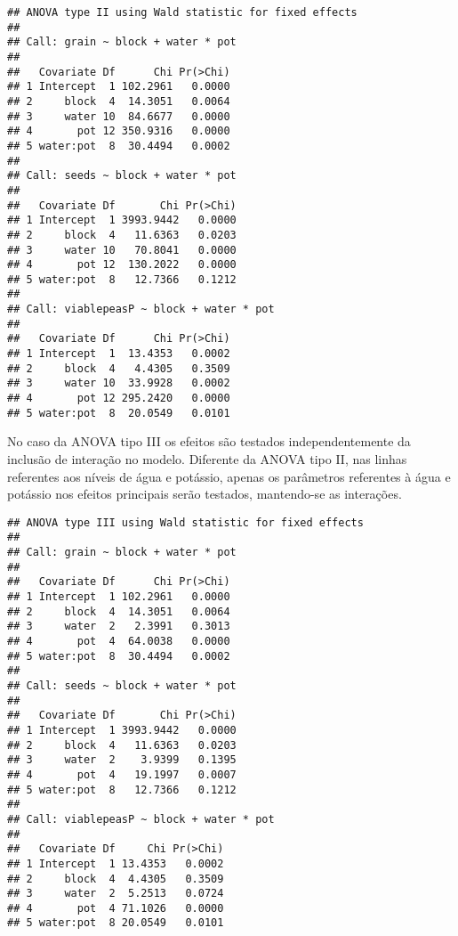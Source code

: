 \begin{knitrout}
\color{fgcolor}\begin{kframe}
\begin{alltt}
\end{alltt}
\begin{verbatim}
## ANOVA type II using Wald statistic for fixed effects
## 
## Call: grain ~ block + water * pot
## 
##   Covariate Df      Chi Pr(>Chi)
## 1 Intercept  1 102.2961   0.0000
## 2     block  4  14.3051   0.0064
## 3     water 10  84.6677   0.0000
## 4       pot 12 350.9316   0.0000
## 5 water:pot  8  30.4494   0.0002
## 
## Call: seeds ~ block + water * pot
## 
##   Covariate Df       Chi Pr(>Chi)
## 1 Intercept  1 3993.9442   0.0000
## 2     block  4   11.6363   0.0203
## 3     water 10   70.8041   0.0000
## 4       pot 12  130.2022   0.0000
## 5 water:pot  8   12.7366   0.1212
## 
## Call: viablepeasP ~ block + water * pot
## 
##   Covariate Df      Chi Pr(>Chi)
## 1 Intercept  1  13.4353   0.0002
## 2     block  4   4.4305   0.3509
## 3     water 10  33.9928   0.0002
## 4       pot 12 295.2420   0.0000
## 5 water:pot  8  20.0549   0.0101
\end{verbatim}
\end{kframe}
\end{knitrout}


No caso da ANOVA tipo III os efeitos são testados independentemente da inclusão de interação no modelo. Diferente da ANOVA tipo II, nas linhas referentes aos níveis de água e potássio, apenas os parâmetros referentes à água e potássio nos efeitos principais serão testados, mantendo-se as interações.

\begin{knitrout}
\color{fgcolor}\begin{kframe}
\begin{alltt}
\end{alltt}
\begin{verbatim}
## ANOVA type III using Wald statistic for fixed effects
## 
## Call: grain ~ block + water * pot
## 
##   Covariate Df      Chi Pr(>Chi)
## 1 Intercept  1 102.2961   0.0000
## 2     block  4  14.3051   0.0064
## 3     water  2   2.3991   0.3013
## 4       pot  4  64.0038   0.0000
## 5 water:pot  8  30.4494   0.0002
## 
## Call: seeds ~ block + water * pot
## 
##   Covariate Df       Chi Pr(>Chi)
## 1 Intercept  1 3993.9442   0.0000
## 2     block  4   11.6363   0.0203
## 3     water  2    3.9399   0.1395
## 4       pot  4   19.1997   0.0007
## 5 water:pot  8   12.7366   0.1212
## 
## Call: viablepeasP ~ block + water * pot
## 
##   Covariate Df     Chi Pr(>Chi)
## 1 Intercept  1 13.4353   0.0002
## 2     block  4  4.4305   0.3509
## 3     water  2  5.2513   0.0724
## 4       pot  4 71.1026   0.0000
## 5 water:pot  8 20.0549   0.0101
\end{verbatim}
\end{kframe}
\end{knitrout}

